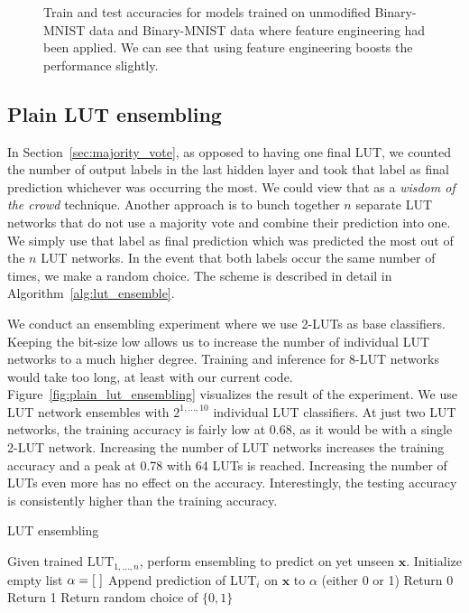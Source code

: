 \begin{figure}[!htb]
    \centering
    
    \caption{Train and test accuracies for models trained on unmodified Binary-MNIST data and Binary-MNIST data where feature engineering had been applied. We can see that using feature engineering boosts the performance slightly.}
\label{fig:sobel_acc}
\end{figure}
\FloatBarrier


\subsection{Plain LUT ensembling} \label{sec:plain_lut_ensemble}
In Section~\ref{sec:majority_vote}, as opposed to having one final LUT, we counted the number of output labels in the last hidden layer and took that label as final prediction whichever was occurring the most. We could view that as a \textit{wisdom of the crowd} technique. Another approach is to bunch together $n$ separate LUT networks that do not use a majority vote and combine their prediction into one. We simply use that label as final prediction which was predicted the most out of the $n$ LUT networks. In the event that both labels occur the same number of times, we make a random choice. The scheme is described in detail in Algorithm~\ref{alg:lut_ensemble}.

We conduct an ensembling experiment where we use 2-LUTs as base classifiers. Keeping the bit-size low allows us to increase the number of individual LUT networks to a much higher degree. Training and inference for 8-LUT networks would take too long, at least with our current code. Figure~\ref{fig:plain_lut_ensembling} visualizes the result of the experiment. We use LUT network ensembles with $2^{1, \dots, 10}$ individual LUT classifiers. At just two LUT networks, the training accuracy is fairly low at 0.68, as it would be with a single 2-LUT network. Increasing the number of LUT networks increases the training accuracy and a peak at 0.78 with 64 LUTs is reached. Increasing the number of LUTs even more has no effect on the accuracy. Interestingly, the testing accuracy is consistently higher than the training accuracy.

\begin{algorithm}
  \caption{LUT ensembling}
  \label{alg:lut_ensemble}
  \begin{algorithmic}
    \State Given trained $\text{LUT}_{1, \dots, n}$, perform ensembling to predict on yet unseen $\bm{x}$.
    \vspace{1em}
    \State Initialize empty list $\alpha = [\hspace{0.3em}]$
      \State Append prediction of LUT$_i$ on $\bm{x}$ to $\alpha$ (either 0 or 1)
    \EndFor
      \State Return 0
      \State Return 1
    \Else
      \State Return random choice of $\{0, 1\}$
    \EndIf
  \end{algorithmic}
\end{algorithm}
\FloatBarrier

